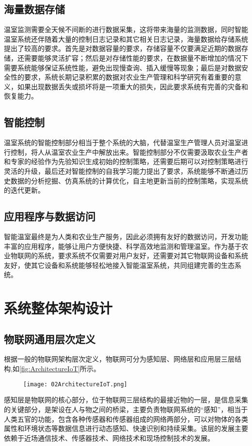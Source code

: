 	\subsection{海量数据存储}
温室监测需要全天候不间断的进行数据采集，这将带来海量的监测数据，同时智能温室系统还伴随着大量的控制日志记录和其它相关日志记录，海量数据给存储系统提出了较高的要求。首先是对数据容量的要求，存储容量不仅要满足近期的数据存储，还需要能够灵活扩容；然后是对存储性能的要求，在数据量不断增加的情况下需要系统能够保证系统性能，避免出现慢查询、插入缓慢等现象；最后是对数据安全性的要求，系统长期记录积累的数据对农业生产管理和科学研究有着重要的意义，如果出现数据丢失或损坏将是一项重大的损失，因此要求系统有完善的灾备和恢复能力。
	\subsection{智能控制}
温室系统的智能控制部分相当于整个系统的大脑，代替温室生产管理人员对温室进行控制，将人从温室农业生产中解放出来。智能控制部分不仅需要汲取农业生产者和专家的经验作为先验知识生成初始的控制策略，还需要后期可以对控制策略进行灵活的升级，最后还对智能控制的自我学习能力提出了要求，系统能够不断通过历史数据的分析挖掘、仿真系统的计算优化，自主地更新当前的控制策略，实现系统的迭代更新。
	\subsection{应用程序与数据访问}
智能温室最终是为人类和农业生产服务，因此必须拥有友好的数据访问，开发功能丰富的应用程序，能够让用户方便快捷、科学高效地监测和管理温室。作为基于农业物联网的系统，要求系统不仅需要对用户友好，还需要对其它物联网设备和系统友好，使其它设备和系统能够轻松地接入智能温室系统，共同组建完善的生态系统。


\section{系统整体架构设计}
	\subsection{物联网通用层次定义}
	根据一般的物联网架构层次定义，物联网可分为感知层、网络层和应用层三层结构,如\ref{fig:ArchitectureIoT}所示。
	\begin{figure}[!htp]
  		\centering
 		\texttt{[image: 02ArchitectureIoT.png]}
	\end{figure}
	感知层是物联网的核心部分，位于物联网三层结构的最接近物的一层，是信息采集的关键部分，是架设在人与物之间的桥梁，主要负责物联网系统的“感知”，相当于人类五官的功能，包含各种传感器和传感器组成的网络两部分，可以对物体的各类属性和环境状态等数据信息进行动态感知、快速识别和持续采集。该层的发展主要依赖于近场通信技术、传感器技术、网络技术和现场控制技术的发展。
	
